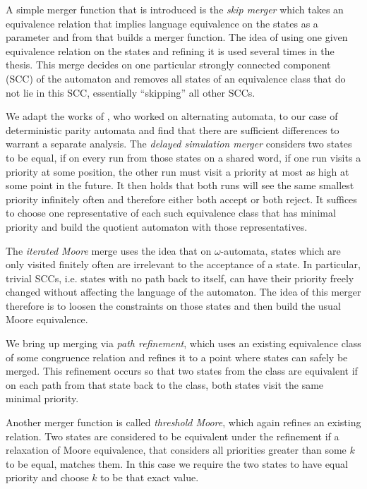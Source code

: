 A simple merger function that is introduced is the \emph{skip merger} which takes an equivalence relation that implies language equivalence on the states as a parameter and from that builds a merger function. The idea of using one given equivalence relation on the states and refining it is used several times in the thesis. This merge decides on one particular strongly connected component (SCC) of the automaton and removes all states of an equivalence class that do not lie in this SCC, essentially \enquote{skipping} all other SCCs.

We adapt the works of \cite{FritzWilke06}, who worked on alternating automata, to our case of deterministic parity automata and find that there are sufficient differences to warrant a separate analysis. The \emph{delayed simulation merger} considers two states to be equal, if on every run from those states on a shared word, if one run visits a priority at some position, the other run must visit a priority at most as high at some point in the future. It then holds that both runs will see the same smallest priority infinitely often and therefore either both accept or both reject. It suffices to choose one representative of each such equivalence class that has minimal priority and build the quotient automaton with those representatives.

The \emph{iterated Moore} merge uses the idea that on $\omega$-automata, states which are only visited finitely often are irrelevant to the acceptance of a state. In particular, trivial SCCs, i.e. states with no path back to itself, can have their priority freely changed without affecting the language of the automaton. The idea of this merger therefore is to loosen the constraints on those states and then build the usual Moore equivalence.

We bring up merging via \emph{path refinement}, which uses an existing equivalence class of some congruence relation and refines it to a point where states can safely be merged. This refinement occurs so that two states from the class are equivalent if on each path from that state back to the class, both states visit the same minimal priority. 

Another merger function is called \emph{threshold Moore}, which again refines an existing relation. Two states are considered to be equivalent under the refinement if a relaxation of Moore equivalence, that considers all priorities greater than some $k$ to be equal, matches them. In this case we require the two states to have equal priority and choose $k$ to be that exact value.

